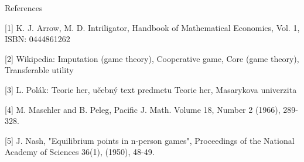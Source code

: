 \documentclass{beamer}
\begin{document}
\begin{frame}{References}

[1] K. J. Arrow, M. D. Intriligator, Handbook of Mathematical Economics, Vol. 1, ISBN: 0444861262

[2] Wikipedia: Imputation (game theory), Cooperative game, Core (game theory), Transferable utility

[3] L. Pol\'ak: Teorie her, u\v{c}ebn\'y text predmetu Teorie her, Masarykova univerzita

[4] M. Maschler and B. Peleg, Pacific J. Math. Volume 18, Number 2 (1966), 289-328.

[5] J. Nash, "Equilibrium points in n-person games", Proceedings of the National Academy of Sciences 36(1), (1950), 48-49.

\end{frame}
\end{document}
